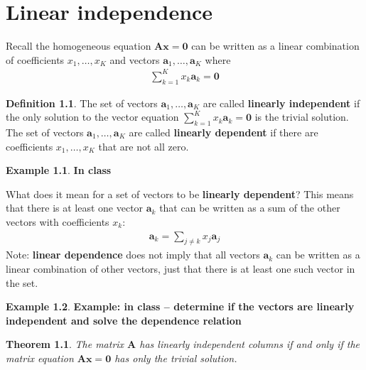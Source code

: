\documentclass[
]{book}
\newtheorem{theorem}{Theorem}[chapter]
\theoremstyle{definition}
\newtheorem{definition}{Definition}[chapter]
\theoremstyle{definition}
\newtheorem{example}{Example}[chapter]
\theoremstyle{definition}
\theoremstyle{remark}
\begin{document}
\hypertarget{linear-independence}{%
\chapter{Linear independence}\label{linear-independence}}

Recall the homogeneous equation \(\mathbf{A} \mathbf{x} = \mathbf{0}\) can be written as a linear combination of coefficients \(x_1, \ldots, x_K\) and vectors \(\mathbf{a}_1, \ldots, \mathbf{a}_K\) where
\[
\begin{aligned}
\sum_{k=1}^K x_k \mathbf{a}_k = \mathbf{0}
\end{aligned}
\]
\begin{definition}
\protect\hypertarget{def:unnamed-chunk-101}{}{\label{def:unnamed-chunk-101} }The set of vectors \(\mathbf{a}_1, \ldots, \mathbf{a}_K\) are called \textbf{linearly independent} if the only solution to the vector equation \(\sum_{k=1}^K x_k \mathbf{a}_k = \mathbf{0}\) is the trivial solution. The set of vectors \(\mathbf{a}_1, \ldots, \mathbf{a}_K\) are called \textbf{linearly dependent} if there are coefficients \(x_1, \ldots, x_K\) that are not all zero.
\end{definition}

\begin{example}
\protect\hypertarget{exm:unnamed-chunk-102}{}{\label{exm:unnamed-chunk-102} }\textbf{In class}
\end{example}

What does it mean for a set of vectors to be \textbf{linearly dependent}? This means that there is at least one vector \(\mathbf{a}_k\) that can be written as a sum of the other vectors with coefficients \(x_k\):
\[
\begin{aligned}
\mathbf{a}_k = \sum_{j \neq k} x_{j} \mathbf{a}_{j}
\end{aligned}
\]
Note: \textbf{linear dependence} does not imply that all vectors \(\mathbf{a}_{k}\) can be written as a linear combination of other vectors, just that there is at least one such vector in the set.

\begin{example}
\protect\hypertarget{exm:unnamed-chunk-103}{}{\label{exm:unnamed-chunk-103} }\textbf{Example: in class -- determine if the vectors are linearly independent and solve the dependence relation}
\end{example}

\begin{theorem}
\protect\hypertarget{thm:unnamed-chunk-104}{}{\label{thm:unnamed-chunk-104} }The matrix \(\mathbf{A}\) has linearly independent columns if and only if the matrix equation \(\mathbf{A}\mathbf{x} = \mathbf{0}\) has only the trivial solution.
\end{theorem}
\end{document}
